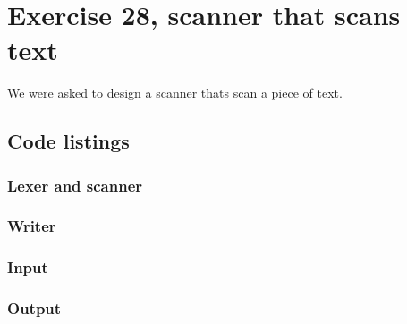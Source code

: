 \documentclass[11pt]{article}
\begin{document}
\section*{Exercise 28, scanner that scans text}
We were asked to design a scanner thats scan a piece of text.

\subsection*{Code listings}







\subsubsection*{Lexer and scanner}



\subsubsection*{Writer}





\subsubsection*{Input}


\subsubsection*{Output}


\end{document}

